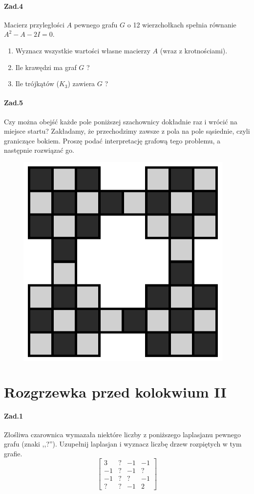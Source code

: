 \documentclass[a4paper,12pt]{article}
\theoremstyle{definition}%
\theoremstyle{definition}
\theoremstyle{problem}
\begin{document}
\paragraph{Zad.4} Macierz przyległości $A$ pewnego grafu $G$ o 12 wierzchołkach spełnia równanie $A^2-A-2I = 0$.
\begin{enumerate}[label=\alph*)]
\item Wyznacz wszystkie wartości własne macierzy $A$ (wraz z krotnościami).
\item Ile krawędzi ma graf $G$ ?
\item Ile trójkątów ($K_3$) zawiera $G$ ?
\end{enumerate}


\paragraph{Zad.5} Czy można obejść każde pole poniższej szachownicy dokładnie raz i wrócić na miejsce startu? Zakładamy, że przechodzimy zawsze z pola na pole sąsiednie, czyli graniczące bokiem. Proszę podać interpretację grafową tego problemu, a następnie rozwiązać go.

\begin{figure}[H]
\centering
\includegraphics[width=.6\textwidth]{img/ROZ_1_5}
\end{figure}

\section{Rozgrzewka przed kolokwium II}
\paragraph{Zad.1} Złośliwa czarownica wymazała niektóre liczby z poniższego laplasjanu pewnego grafu (znaki ,,?''). Uzupełnij laplasjan i wyznacz liczbę drzew rozpiętych w tym grafie.
$$\begin{bmatrix}
3& ?& -1& -1\\
-1& ?& -1& ?\\
-1& ?& ?& -1\\
?& ?& -1& 2
\end{bmatrix}$$
\end{document}
